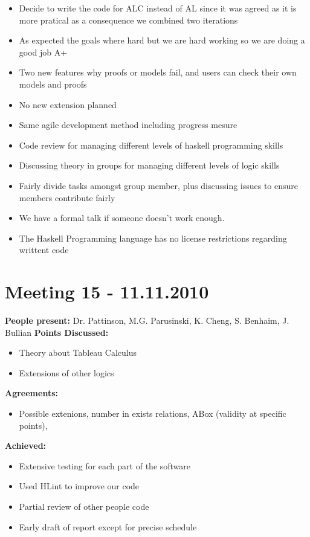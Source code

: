 \documentclass[12pt,a4paper]{article}
\begin{document}
\begin{itemize}
\item Decide to write the code for ALC instead of AL since it was agreed as it is more pratical as a consequence we combined two iterations
\item As expected the goals where hard but we are hard working so we are doing a good job A+
\item Two new features why proofs or models fail, and users can check their own models and proofs
\item No new extension planned
\item Same agile development method including progress mesure
\item Code review for managing different levels of haskell programming skills
\item Discussing theory in groups for managing different levels of logic skills
\item Fairly divide tasks amongst group member, plus discussing issues to ensure members contribute fairly
\item We have a formal talk if someone doesn't work enough.
\item The Haskell Programming language has no license restrictions regarding writtent code
\end{itemize}

\section*{Meeting 15 - 11.11.2010}
\textbf{People present:} Dr. Pattinson, M.G. Parusinski, K. Cheng, S. Benhaim, J. Bullian
\textbf{Points Discussed:}
\begin{itemize}
\item Theory about Tableau Calculus
\item Extensions of other logics
\end{itemize}
\textbf{Agreements:}
\begin{itemize}
\item Possible extenions, number in exists relations, ABox (validity at specific points), 
\end{itemize}
\textbf{Achieved:}
\begin{itemize}
\item Extensive testing for each part of the software
\item Used HLint to improve our code
\item Partial review of other people code
\item Early draft of report except for precise schedule
\end{itemize}
\end{document}
